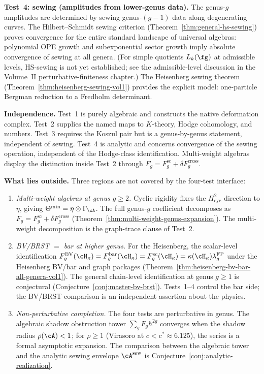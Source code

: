 \begin{remark}
\smallskip
\noindent\textbf{Test~4: sewing (amplitudes from lower-genus data).}
The genus-$g$ amplitudes are determined by sewing genus-$(g-1)$
data along degenerating curves.
The Hilbert--Schmidt sewing criterion
(Theorem~\ref{thm:general-hs-sewing}) proves convergence for
the entire standard landscape of universal algebras: polynomial
OPE growth and subexponential sector growth imply absolute
convergence of sewing at all genera. (For simple quotients
$L_k(\fg)$ at admissible levels, HS-sewing is not yet
established; see the admissible-level discussion in the
Volume~II perturbative-finiteness chapter.) The Heisenberg sewing theorem
(Theorem~\ref{thm:heisenberg-sewing-vol1}) provides the explicit model:
one-particle Bergman reduction to a Fredholm determinant.

\medskip
\noindent\textbf{Independence.}
Test~1 is purely algebraic and constructs the native deformation
complex.  Test~2 supplies the named maps to $K$-theory, Hodge
cohomology, and numbers.
Test~3 requires the Koszul pair but is a genus-by-genus statement,
independent of sewing.
Test~4 is analytic and concerns convergence of the sewing operation,
independent of the Hodge-class identification.
Multi-weight algebras display the distinction inside Test~2 through
$F_g=F_g^{\mathrm{sc}}+\delta F_g^{\mathrm{cross}}$.

\medskip
\noindent\textbf{What lies outside.}
Three regions are not covered by the four-test interface:
\begin{enumerate}[label=\textup{(\alph*)},nosep]
\item \emph{Multi-weight algebras at genus $g \geq 2$.}
 Cyclic rigidity fixes the $H^2_{\mathrm{cyc}}$ direction
 to $\eta$, giving $\Theta^{\min} = \eta \otimes \Gamma_\cA$.
 The full genus-$g$ coefficient decomposes as
 $F_g=F_g^{\mathrm{sc}}+\delta F_g^{\mathrm{cross}}$
 (Theorem~\ref{thm:multi-weight-genus-expansion}).
 The multi-weight decomposition is the graph-trace clause of Test~2.
	 \item \emph{BV/BRST $=$ bar at higher genus.}
	 For the Heisenberg, the scalar-level identification
	 $F_g^{\mathrm{BV}}(\cH_\kappa)
	 = F_g^{\mathrm{bar}}(\cH_\kappa)
	 = F_g^{\mathrm{sc}}(\cH_\kappa)
	 = \kappa(\cH_\kappa)\lambda_g^{\mathrm{FP}}$
	 under the Heisenberg BV/bar and graph packages
 (Theorem~\ref{thm:heisenberg-bv-bar-all-genera-vol1}).
 The general chain-level identification at genus $g \geq 1$
 is conjectural
 (Conjecture~\ref{conj:master-bv-brst}). Tests~1--4 control
 the bar side; the BV/BRST comparison is an independent
 assertion about the physics.
\item \emph{Non-perturbative completion.}
 The four tests are perturbative in genus. The
 algebraic shadow obstruction tower $\sum_g F_g \hbar^{2g}$ converges
 when the shadow radius $\rho(\cA) < 1$; for
 $\rho \geq 1$ (Virasoro at $c < c^* \approx 6.125$), the
 series is a formal asymptotic expansion. The comparison
 between the algebraic tower and the analytic sewing envelope
 $\cA^{\mathrm{sew}}$ is
 Conjecture~\ref{conj:analytic-realization}.
\end{enumerate}
\end{remark}

